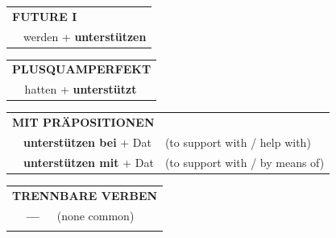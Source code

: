 \documentclass[10pt,a4paper]{revtex4-2}
\begin{document}
\begin{verbbox}
\begin{tabular}{rl}
    \multicolumn{2}{l}{\textbf{FUTURE I} }\\
   & werden + \textbf{unterstützen}\\
 
  \end{tabular}
\hfill
   \begin{tabular}{rl}
      \multicolumn{2}{l}{\textbf{PLUSQUAMPERFEKT}}\\
   & hatten + \textbf{unterstützt}\\
  \end{tabular}

   \vspace{10pt}

   \begin{tabular}{lll}
      \multicolumn{3}{l}{\textbf{MIT PRÄPOSITIONEN}}\\
& \textbf{unterstützen bei} + Dat & (to support with / help with)\\
& \textbf{unterstützen mit} + Dat & (to support with / by means of)\\
\end{tabular}
  \hfill
   \begin{tabular}{lll}
      \multicolumn{3}{l}{\textbf{TRENNBARE VERBEN}}\\
 & \textbf{---} & (none common)\\
\vspace{10pt}
  \end{tabular}


  \vspace{-5pt}


\end{verbbox}
\end{document}
